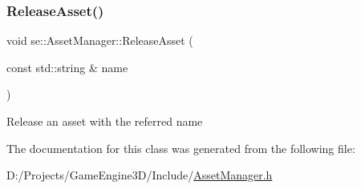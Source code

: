 \subsubsection{\texorpdfstring{Release\+Asset()}{ReleaseAsset()}}
{\footnotesize\ttfamily void se\+::\+Asset\+Manager\+::\+Release\+Asset (\begin{DoxyParamCaption}\item[{const std\+::string \&}]{name }\end{DoxyParamCaption})}

Release an asset with the referred name 

The documentation for this class was generated from the following file\+:\begin{DoxyCompactItemize}
\item 
D\+:/\+Projects/\+Game\+Engine3\+D/\+Include/\mbox{\hyperlink{_asset_manager_8h}{Asset\+Manager.\+h}}\end{DoxyCompactItemize}
